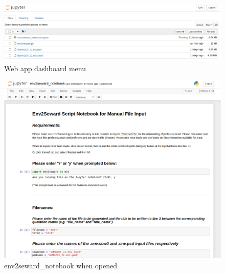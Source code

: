 \documentclass[10pt]{article}
\begin{document}
\begin{figure}
	\centering
	\includegraphics[width=1.3\linewidth]{dashboard.png}
	\caption{Web app dashboard menu}
	\label{fig:screenshot-from-2020-06-23-12-26-13}
\end{figure}

\begin{figure}
	\centering
	\includegraphics[width=1.3\linewidth]{notebook.png}
	\caption{env2seward\_notebook when opened}
	\label{fig:screenshot-from-2020-06-23-12-26-25}
\end{figure}
\end{document}
